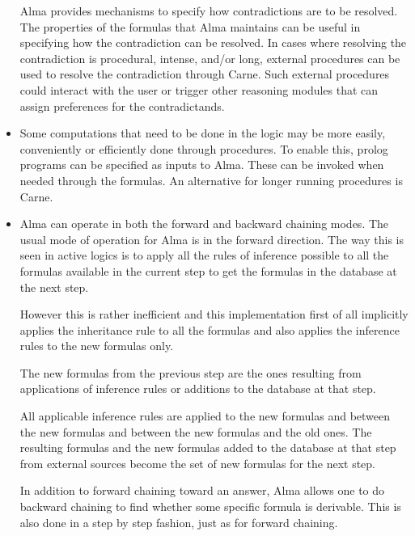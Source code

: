 \begin{itemize}
Alma provides mechanisms to specify how contradictions are to be
resolved. The properties of the formulas that Alma maintains can be  
useful in specifying how the contradiction can be resolved. In cases
where resolving the contradiction is procedural, intense, and/or long,
external procedures can be used to resolve the contradiction through
Carne. Such external procedures could interact with the user or
trigger other reasoning modules that can assign preferences for the
contradictands.  


\item
Some computations that need to be done in the logic may be more
easily, conveniently or efficiently done through procedures. To enable
this, prolog programs can be specified as inputs to Alma. These can be
invoked when needed through the formulas. An alternative for longer
running procedures is Carne.

\item 
Alma can operate in both the forward and backward chaining modes.
The usual mode of operation for Alma is in the forward direction. The
way this is seen in active logics is to apply all the rules of
inference possible to all the formulas available in the current step
to get the formulas in the database at the next step. 


However this is rather inefficient and this implementation first of
all implicitly applies the inheritance rule to all the formulas and
also applies the inference rules to the new formulas only.

The new formulas from the previous step are the ones
resulting from applications of inference rules or additions to the
database at that step.

All applicable inference rules are applied to the new formulas and
between the new formulas and between the new formulas and the old
ones. The resulting formulas and the new formulas added to the
database at that step from external sources become the set of new
formulas for the next step.

In addition to forward chaining toward an answer, Alma allows one to do
backward chaining to find whether some specific formula is
derivable. This is also done in a step by step fashion, just as for
forward chaining.

\end{itemize}


